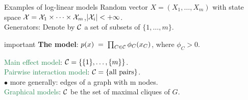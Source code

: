 \documentclass[11pt,handout,aspectratio=169,dvipsnames]{beamer}
\begin{document}
\begin{frame}{Examples of log-linear models}
Random vector $X=(X_1,\ldots,X_m)$ with state space ${\cal X}={\cal X}_1\times \cdots\times {\cal X}_m$,\quad  $|{\cal X}_i|<+\infty$.\\[.3cm]
	\alert{Generators}: Denote by ${\cal C}$ a set of subsets of $\{1,\ldots,m\}$.\\[.4cm]
	

	\begin{beamercolorbox}[wd=\paperwidth,sep=3pt]{important}
		\textbf{The model}: $p(x)\;=\;\prod_{C\in {\cal C}} \phi_C(x_C)$, \;\;where $\phi_C>0$.
	\end{beamercolorbox}
	\bigskip
	
	\textcolor{SeaGreen}{Main effect model}: ${\cal C}=\{\{1\},\ldots,\{m\}\}$.\\[.3cm]
	\textcolor{SeaGreen}{Pairwise interaction model}: ${\cal C}=\{\mbox{all pairs}\}$.\\
	\qquad $\bullet$ more generally: edges of a graph with m nodes.\\[.3cm]
		\textcolor{SeaGreen}{Graphical models}: ${\cal C}$ be the set of maximal cliques of $G$.\\[.3cm]
\end{frame}

%
%		
\end{document}
